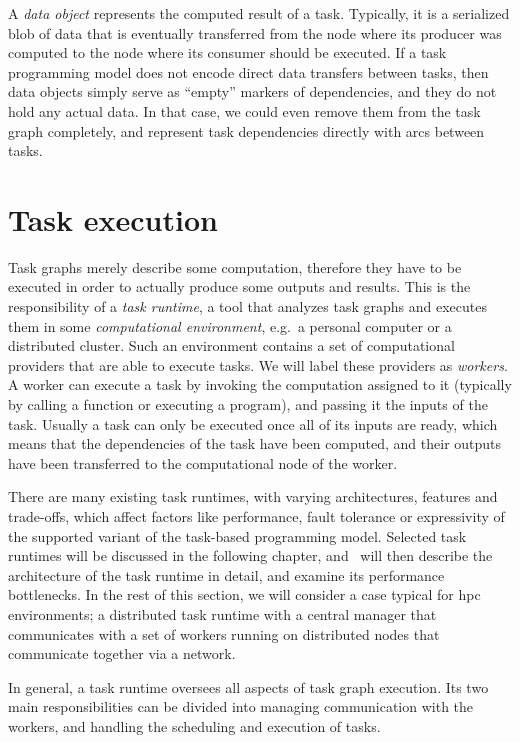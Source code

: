 A \emph{data object} represents the computed result of a task. Typically, it is a serialized
blob of data that is eventually transferred from the node where its producer was computed to the
node where its consumer should be executed. If a task programming model does not encode direct data
transfers between tasks, then data objects simply serve as ``empty'' markers of dependencies, and
they do not hold any actual data. In that case, we could even remove them from the task graph
completely, and represent task dependencies directly with arcs between tasks.

\section{Task execution}
Task graphs merely describe some computation, therefore they have to be executed in order to
actually produce some outputs and results. This is the responsibility of a \emph{task runtime},
a tool that analyzes task graphs and executes them in some \emph{computational environment}, e.g.\ a personal
computer or a distributed cluster. Such an environment contains a set of computational providers
that are able to execute tasks. We will label these providers as \emph{workers}. A worker
can execute a task by invoking the computation assigned to it (typically by calling a function or
executing a program), and passing it the inputs of the task. Usually a task can only be executed
once all of its inputs are ready, which means that the dependencies of the task have been computed,
and their outputs have been transferred to the computational node of the worker.

There are many existing task runtimes, with varying architectures, features and trade-offs, which
affect factors like performance, fault tolerance or expressivity of the supported variant of the
task-based programming model. Selected task runtimes will be discussed in the following chapter,
and~ will then describe the architecture of the \dask{} task
runtime in detail, and examine its performance bottlenecks. In the rest of this section, we will
consider a case typical for \gls{hpc} environments; a distributed task runtime with a
central manager that communicates with a set of workers running on distributed nodes that
communicate together via a network.

In general, a task runtime oversees all aspects of task graph execution. Its two main
responsibilities can be divided into managing communication with the workers, and handling the
scheduling and execution of tasks.

